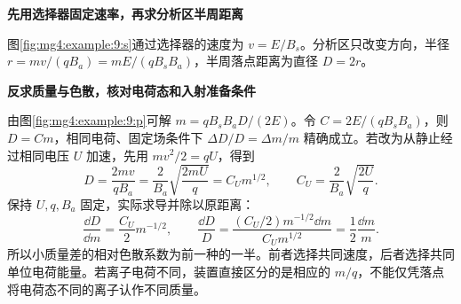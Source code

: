 \begin{solution}\textbf{先用选择器固定速率，再求分析区半周距离}\par\nobreak
图\ref{fig:mg4:example:9:s}通过选择器的速度为 $v=E/B_s$。分析区只改变方向，半径 $r=mv/(qB_a)=mE/(qB_sB_a)$，半周落点距离为直径 $D=2r$。



\par\medskip{}\noindent\textbf{反求质量与色散，核对电荷态和入射准备条件}\par\nobreak
由图\ref{fig:mg4:example:9:p}可解 $m=qB_sB_aD/(2E)$。令 $C=2E/(qB_sB_a)$，则 $D=Cm$，相同电荷、固定场条件下 $\Delta D/D=\Delta m/m$ 精确成立。若改为从静止经过相同电压 $U$ 加速，先用 $mv^2/2=qU$，得到
\[
 D=\frac{2mv}{qB_a}=\frac2{B_a}\sqrt{\frac{2mU}{q}}=C_Um^{1/2},
 \qquad C_U=\frac2{B_a}\sqrt{\frac{2U}{q}}.
\]
保持 $U,q,B_a$ 固定，实际求导并除以原距离：
\[
 \frac{\dd D}{\dd m}=\frac{C_U}{2}m^{-1/2},\qquad
 \frac{\dd D}{D}=\frac{(C_U/2)m^{-1/2}\dd m}{C_Um^{1/2}}
 =\frac12\frac{\dd m}{m}.
\]
所以小质量差的相对色散系数为前一种的一半。前者选择共同速度，后者选择共同单位电荷能量。若离子电荷不同，装置直接区分的是相应的 $m/q$，不能仅凭落点将电荷态不同的离子认作不同质量。\end{solution}
